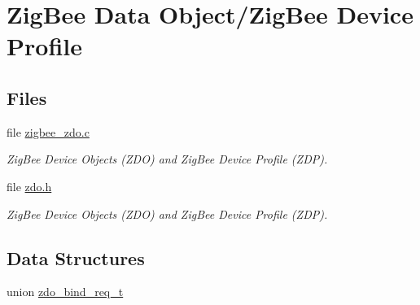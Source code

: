 \hypertarget{group__zdo}{\section{Zig\-Bee Data Object/\-Zig\-Bee Device Profile}
\label{group__zdo}
}
\subsection*{Files}
\begin{DoxyCompactItemize}
\item 
file \hyperlink{zigbee__zdo_8c}{zigbee\-\_\-zdo.\-c}
\begin{DoxyCompactList}\small\item\em Zig\-Bee Device Objects (Z\-D\-O) and Zig\-Bee Device Profile (Z\-D\-P). \end{DoxyCompactList}\item 
file \hyperlink{zdo_8h}{zdo.\-h}
\begin{DoxyCompactList}\small\item\em Zig\-Bee Device Objects (Z\-D\-O) and Zig\-Bee Device Profile (Z\-D\-P). \end{DoxyCompactList}\end{DoxyCompactItemize}
\subsection*{Data Structures}
\begin{DoxyCompactItemize}
\item 
union \hyperlink{unionzdo__bind__req__t}{zdo\-\_\-bind\-\_\-req\-\_\-t}
\end{DoxyCompactItemize}
